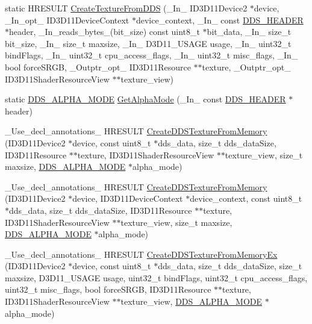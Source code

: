 \begin{DoxyCompactItemize}
static H\+R\+E\+S\+U\+LT \hyperlink{namespacemage_a53fb464961d52002316f17c59ce58078}{Create\+Texture\+From\+D\+DS} (\+\_\+\+In\+\_\+ I\+D3\+D11\+Device2 $\ast$device, \+\_\+\+In\+\_\+opt\+\_\+ I\+D3\+D11\+Device\+Context $\ast$device\+\_\+context, \+\_\+\+In\+\_\+ const \hyperlink{structmage_1_1_d_d_s___h_e_a_d_e_r}{D\+D\+S\+\_\+\+H\+E\+A\+D\+ER} $\ast$header, \+\_\+\+In\+\_\+reads\+\_\+bytes\+\_\+(bit\+\_\+size) const uint8\+\_\+t $\ast$bit\+\_\+data, \+\_\+\+In\+\_\+ size\+\_\+t bit\+\_\+size, \+\_\+\+In\+\_\+ size\+\_\+t maxsize, \+\_\+\+In\+\_\+ D3\+D11\+\_\+\+U\+S\+A\+GE usage, \+\_\+\+In\+\_\+ uint32\+\_\+t bind\+Flags, \+\_\+\+In\+\_\+ uint32\+\_\+t cpu\+\_\+access\+\_\+flags, \+\_\+\+In\+\_\+ uint32\+\_\+t misc\+\_\+flags, \+\_\+\+In\+\_\+ bool force\+S\+R\+GB, \+\_\+\+Outptr\+\_\+opt\+\_\+ I\+D3\+D11\+Resource $\ast$$\ast$texture, \+\_\+\+Outptr\+\_\+opt\+\_\+ I\+D3\+D11\+Shader\+Resource\+View $\ast$$\ast$texture\+\_\+view)
\item 
static \hyperlink{namespacemage_a0c586a2bad862f4858900ca121ca80c2}{D\+D\+S\+\_\+\+A\+L\+P\+H\+A\+\_\+\+M\+O\+DE} \hyperlink{namespacemage_afcc0891e1660f8457696cb30f4ee518a}{Get\+Alpha\+Mode} (\+\_\+\+In\+\_\+ const \hyperlink{structmage_1_1_d_d_s___h_e_a_d_e_r}{D\+D\+S\+\_\+\+H\+E\+A\+D\+ER} $\ast$header)
\item 
\+\_\+\+Use\+\_\+decl\+\_\+annotations\+\_\+ H\+R\+E\+S\+U\+LT \hyperlink{namespacemage_a1570abdb85a5a68b2d78944b2446f98d}{Create\+D\+D\+S\+Texture\+From\+Memory} (I\+D3\+D11\+Device2 $\ast$device, const uint8\+\_\+t $\ast$dds\+\_\+data, size\+\_\+t dds\+\_\+data\+Size, I\+D3\+D11\+Resource $\ast$$\ast$texture, I\+D3\+D11\+Shader\+Resource\+View $\ast$$\ast$texture\+\_\+view, size\+\_\+t maxsize, \hyperlink{namespacemage_a0c586a2bad862f4858900ca121ca80c2}{D\+D\+S\+\_\+\+A\+L\+P\+H\+A\+\_\+\+M\+O\+DE} $\ast$alpha\+\_\+mode)
\item 
\+\_\+\+Use\+\_\+decl\+\_\+annotations\+\_\+ H\+R\+E\+S\+U\+LT \hyperlink{namespacemage_ad4aea1524bc1c8262da263d10cea5b5d}{Create\+D\+D\+S\+Texture\+From\+Memory} (I\+D3\+D11\+Device2 $\ast$device, I\+D3\+D11\+Device\+Context $\ast$device\+\_\+context, const uint8\+\_\+t $\ast$dds\+\_\+data, size\+\_\+t dds\+\_\+data\+Size, I\+D3\+D11\+Resource $\ast$$\ast$texture, I\+D3\+D11\+Shader\+Resource\+View $\ast$$\ast$texture\+\_\+view, size\+\_\+t maxsize, \hyperlink{namespacemage_a0c586a2bad862f4858900ca121ca80c2}{D\+D\+S\+\_\+\+A\+L\+P\+H\+A\+\_\+\+M\+O\+DE} $\ast$alpha\+\_\+mode)
\item 
\+\_\+\+Use\+\_\+decl\+\_\+annotations\+\_\+ H\+R\+E\+S\+U\+LT \hyperlink{namespacemage_ad29f0d5028acb22c5f5e1a333e6a622b}{Create\+D\+D\+S\+Texture\+From\+Memory\+Ex} (I\+D3\+D11\+Device2 $\ast$device, const uint8\+\_\+t $\ast$dds\+\_\+data, size\+\_\+t dds\+\_\+data\+Size, size\+\_\+t maxsize, D3\+D11\+\_\+\+U\+S\+A\+GE usage, uint32\+\_\+t bind\+Flags, uint32\+\_\+t cpu\+\_\+access\+\_\+flags, uint32\+\_\+t misc\+\_\+flags, bool force\+S\+R\+GB, I\+D3\+D11\+Resource $\ast$$\ast$texture, I\+D3\+D11\+Shader\+Resource\+View $\ast$$\ast$texture\+\_\+view, \hyperlink{namespacemage_a0c586a2bad862f4858900ca121ca80c2}{D\+D\+S\+\_\+\+A\+L\+P\+H\+A\+\_\+\+M\+O\+DE} $\ast$alpha\+\_\+mode)

\end{DoxyCompactItemize}

